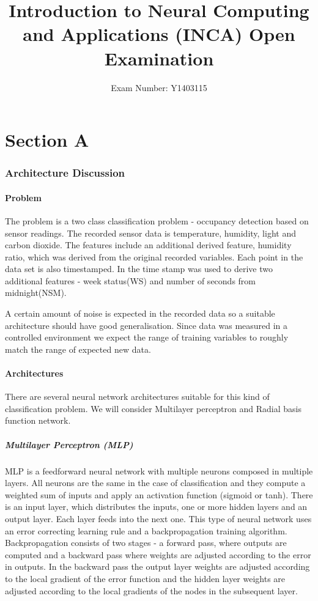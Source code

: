 \documentclass[a4paper, 11pt]{article}
\begin{document}
\title{Introduction to Neural Computing and Applications (INCA)
Open Examination}
\author{Exam Number: Y1403115}
\date{}
\maketitle


\part*{Section A}
\section{Architecture Discussion}

\subsection{Problem}
The problem is a two class classification problem - occupancy detection based on sensor readings. The recorded sensor data is temperature, humidity, light and carbon dioxide. The features include an additional derived feature, humidity ratio, which was derived from the original recorded variables. Each point in the data set is also timestamped. In \cite{Candanedo2016} the time stamp was used to derive two additional features - week status(WS) and number of seconds from midnight(NSM).

A certain amount of noise is expected in the recorded data so a suitable architecture should have good generalisation. Since data was measured in a controlled environment we expect the range of training variables to roughly match the range of expected new data.

\subsection{Architectures}
There are several neural network architectures suitable for this kind of classification problem. We will consider Multilayer perceptron and Radial basis function network. 
\subsubsection{Multilayer Perceptron (MLP)}
MLP is a feedforward neural network with multiple neurons composed in multiple layers. All neurons are the same in the case of classification and they compute a weighted sum of inputs and apply an activation function (sigmoid or tanh). There is an input layer, which distributes the inputs, one or more hidden layers and an output layer. Each layer feeds into the next one. This type of neural network uses an error correcting learning rule and a backpropagation training algorithm. Backpropagation consists of two stages - a forward pass, where outputs are computed and a backward pass where weights are adjusted according to the error in outputs. In the backward pass the output layer weights are adjusted according to the local gradient of the error function and the hidden layer weights are adjusted according to the local gradients of the nodes in the subsequent layer. 
\end{document}
